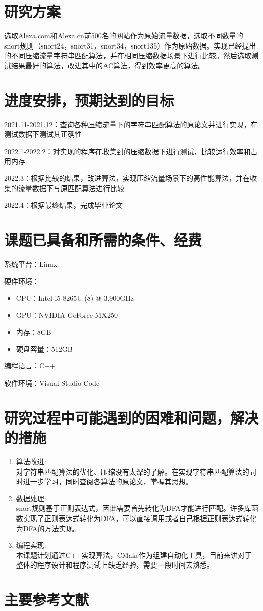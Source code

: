\vspace{8mm}
\section{研究方案}
选取Alexa.com和Alexa.cn前500名的网站作为原始流量数据，选取不同数量的snort规则（snort24，snort31，snort34，snort135）作为原始数据。实现已经提出的不同压缩流量字符串匹配算法，并在相同压缩数据场景下进行比较。然后选取测试结果最好的算法，改进其中的AC算法，得到效率更高的算法。

\vspace{8mm}
\section{进度安排，预期达到的目标}
2021.11-2021.12：查询各种压缩流量下的字符串匹配算法的原论文并进行实现，在测试数据下测试其正确性

2022.1-2022.2：对实现的程序在收集到的压缩数据下进行测试，比较运行效率和占用内存

2022.3：根据比较的结果，改进算法，实现压缩流量场景下的高性能算法，并在收集的流量数据下与原匹配算法进行比较

2022.4：根据最终结果，完成毕业论文

\vspace{8mm}
\section{课题已具备和所需的条件、经费}
系统平台：Linux

硬件环境：
\begin{itemize}
  \item CPU：Intel i5-8265U (8) @ 3.900GHz
  \item GPU：NVIDIA GeForce MX250    
  \item 内存：8GB
  \item 硬盘容量：512GB
\end{itemize}

编程语言：C++

软件环境：Visual Studio Code

\vspace{8mm}
\section{研究过程中可能遇到的困难和问题，解决的措施}
\begin{enumerate}
  \item 算法改进:\\对字符串匹配算法的优化、压缩没有太深的了解。在实现字符串匹配算法的同时进一步学习，同时查阅各算法的原论文，掌握其思想。
  \item 数据处理:\\snort规则基于正则表达式，因此需要首先转化为DFA才能进行匹配。许多库函数实现了正则表达式转化为DFA，可以直接调用或者自己根据正则表达式转化为DFA的方法\cite{张树壮2011面向网络安全的正则表达式匹配技术}实现。
  \item 编程实现:\\本课题计划通过C++实现算法，CMake作为组建自动化工具，目前来讲对于整体的程序设计和程序测试上缺乏经验，需要一段时间去熟悉。
\end{enumerate}

\vspace{8mm}
\section{主要参考文献}



